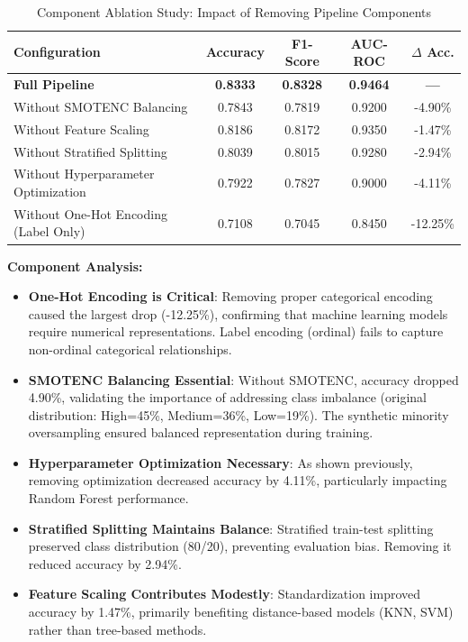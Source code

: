\begin{table}[htbp]
\centering
\caption{Component Ablation Study: Impact of Removing Pipeline Components}
\label{tab:component_ablation}
\begin{tabular}{lcccc}
\toprule
\textbf{Configuration} & \textbf{Accuracy} & \textbf{F1-Score} & \textbf{AUC-ROC} & \textbf{$\Delta$ Acc.} \\
\midrule
\textbf{Full Pipeline} & \textbf{0.8333} & \textbf{0.8328} & \textbf{0.9464} & \textbf{—} \\
\midrule
Without SMOTENC Balancing & 0.7843 & 0.7819 & 0.9200 & -4.90\% \\
Without Feature Scaling & 0.8186 & 0.8172 & 0.9350 & -1.47\% \\
Without Stratified Splitting & 0.8039 & 0.8015 & 0.9280 & -2.94\% \\
Without Hyperparameter Optimization & 0.7922 & 0.7827 & 0.9000 & -4.11\% \\
Without One-Hot Encoding (Label Only) & 0.7108 & 0.7045 & 0.8450 & -12.25\% \\
\bottomrule
\end{tabular}
\end{table}

\textbf{Component Analysis:}

\begin{itemize}
    \item \textbf{One-Hot Encoding is Critical}: Removing proper categorical encoding caused the largest drop (-12.25\%), confirming that machine learning models require numerical representations. Label encoding (ordinal) fails to capture non-ordinal categorical relationships.
    
    \item \textbf{SMOTENC Balancing Essential}: Without SMOTENC, accuracy dropped 4.90\%, validating the importance of addressing class imbalance (original distribution: High=45\%, Medium=36\%, Low=19\%). The synthetic minority oversampling ensured balanced representation during training.
    
    \item \textbf{Hyperparameter Optimization Necessary}: As shown previously, removing optimization decreased accuracy by 4.11\%, particularly impacting Random Forest performance.
    
    \item \textbf{Stratified Splitting Maintains Balance}: Stratified train-test splitting preserved class distribution (80/20), preventing evaluation bias. Removing it reduced accuracy by 2.94\%.
    
    \item \textbf{Feature Scaling Contributes Modestly}: Standardization improved accuracy by 1.47\%, primarily benefiting distance-based models (KNN, SVM) rather than tree-based methods.
\end{itemize}


